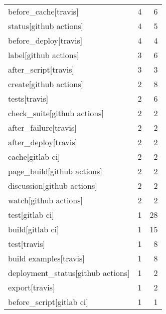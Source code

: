 \begin{tabular}{lrr}
before\_cache[travis]                        &                   4 &             6 \\
status[github actions]                      &                   4 &             5 \\
before\_deploy[travis]                       &                   4 &             4 \\
label[github actions]                       &                   3 &             6 \\
after\_script[travis]                        &                   3 &             3 \\
create[github actions]                      &                   2 &             8 \\
tests[travis]                               &                   2 &             6 \\
check\_suite[github actions]                 &                   2 &             2 \\
after\_failure[travis]                       &                   2 &             2 \\
after\_deploy[travis]                        &                   2 &             2 \\
cache[gitlab ci]                            &                   2 &             2 \\
page\_build[github actions]                  &                   2 &             2 \\
discussion[github actions]                  &                   2 &             2 \\
watch[github actions]                       &                   2 &             2 \\
test[gitlab ci]                             &                   1 &            28 \\
build[gitlab ci]                            &                   1 &            15 \\
test[travis]                                &                   1 &             8 \\
build examples[travis]                      &                   1 &             8 \\
deployment\_status[github actions]           &                   1 &             2 \\
export[travis]                              &                   1 &             2 \\
before\_script[gitlab ci]                    &                   1 &             1 \\

\end{tabular}
